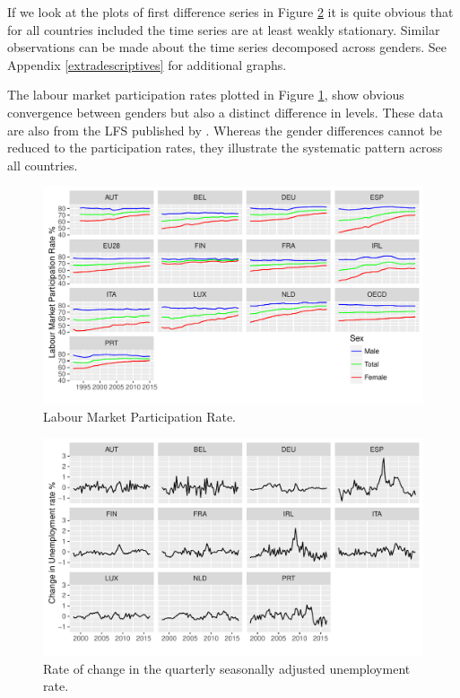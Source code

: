 \documentclass[12pt,a4paper,english]{article}
\begin{document}
If we look at the plots of first difference series in Figure \ref{STSA_diff_facet} it is quite obvious that for all countries included the time series are at least weakly stationary. Similar observations can be made about the time series decomposed across genders. See Appendix \ref{extradescriptives} for additional graphs.
     
The labour market participation rates plotted in Figure \ref{LFPR}, show obvious convergence between genders but also a distinct difference in levels. These data are also from the LFS published by \cite{oecdLFS}. Whereas the gender differences cannot be reduced to the participation rates, they illustrate the systematic pattern across all countries. 

\begin{figure}[H]
\vspace{1.5cm}
\centering
\includegraphics[width=0.9\linewidth]{Graphs/LFPR_FE_MA_TT_facet}
\caption{Labour Market Participation Rate. \cite{oecdLFS}}
\label{LFPR}
\end{figure}
                                     
\begin{figure}[H]
\centering
\includegraphics[width=0.9\linewidth]{Graphs/STSA_TT_diff_facet}
\caption{Rate of change in the quarterly seasonally adjusted unemployment rate. \cite{oecdLFS}}
\label{STSA_diff_facet}
\end{figure}
\end{document}
